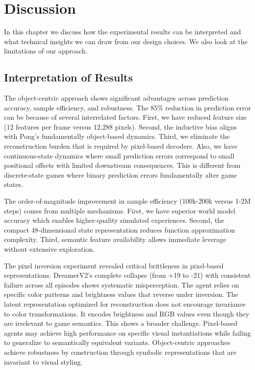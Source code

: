 \documentclass[
	english,
	ruledheaders=section,
	class=report,
	thesis={type=master},
	accentcolor=9c,
	custommargins=true,
	marginpar=false,
	parskip=half-,
	fontsize=11pt,
	pdfa=true,
]{tudapub}
\newcommand{\worldmodel}{world model}
\begin{document}
\chapter{Discussion}
\label{chap:discussion}

In this chapter we discuss how the experimental results can be interpreted and
what technical insights we can draw from our design choices. We also look at
the limitations of our approach.

\section{Interpretation of Results}
\label{sec:interpretation}

The object-centric approach shows significant advantages across prediction
accuracy, sample efficiency, and robustness. The 85\% reduction in prediction
error can be because of several interrelated factors. First, we have reduced
feature size (12 features per frame versus 12,288 pixels). Second, the
inductive bias aligns with Pong's fundamentally object-based dynamics. Third,
we eliminate the reconstruction burden that is required by pixel-based
decoders. Also, we have continuous-state dynamics where small prediction errors
correspond to small positional offsets with limited downstream consequences.
This is different from discrete-state games where binary prediction errors
fundamentally alter game states.

The order-of-magnitude improvement in sample efficiency (100k-200k versus 1-2M
steps) comes from multiple mechanisms. First, we have superior \worldmodel{}
accuracy which enables higher-quality simulated experiences. Second, the
compact 48-dimensional state representation reduces function approximation
complexity. Third, semantic feature availability allows immediate leverage
without extensive exploration.

The pixel inversion experiment revealed critical brittleness in pixel-based
representations. DreamerV2's complete collapse (from +19 to -21) with
consistent failure across all episodes shows systematic misperception. The
agent relies on specific color patterns and brightness values that reverse
under inversion. The latent representation optimized for reconstruction does
not encourage invariance to color transformations. It encodes brightness and
RGB values even though they are irrelevant to game semantics. This shows a
broader challenge. Pixel-based agents may achieve high performance on specific
visual instantiations while failing to generalize to semantically equivalent
variants. Object-centric approaches achieve robustness by construction through
symbolic representations that are invariant to visual styling.
\end{document}
